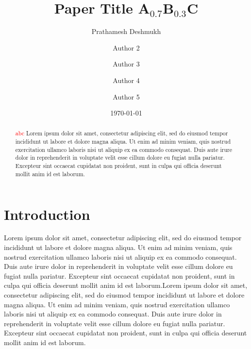 \documentclass[final,3p,times,twocolumn]{elsarticle}
\begin{document}
\begin{frontmatter} 

\title{Paper Title A$_{0.7}$B$_{0.3}$C}

\author[1]{Prathamesh Deshmukh}
\author[1]{Author 2}
\author[1]{Author 3}
\author[1]{Author 4}
\author[1]{Author 5}


\date{\today}

\begin{abstract}
\textcolor{red}{abc}
Lorem ipsum dolor sit amet, consectetur adipiscing elit, sed do eiusmod tempor incididunt ut labore et dolore magna aliqua. Ut enim ad minim veniam, quis nostrud exercitation ullamco laboris nisi ut aliquip ex ea commodo consequat. Duis aute irure dolor in reprehenderit in voluptate velit esse cillum dolore eu fugiat nulla pariatur. Excepteur sint occaecat cupidatat non proident, sunt in culpa qui officia deserunt mollit anim id est laborum.
\end{abstract}
\end{frontmatter}

 \begin{comment}

Lorem ipsum dolor sit amet, consectetur adipiscing elit, sed do eiusmod tempor incididunt ut labore et dolore magna aliqua. Ut enim ad minim veniam, quis nostrud exercitation ullamco laboris nisi ut aliquip ex ea commodo consequat. Duis aute irure dolor in reprehenderit in voluptate velit esse cillum dolore eu fugiat nulla pariatur. Excepteur sint occaecat cupidatat non proident, sunt in culpa qui officia deserunt mollit anim id est laborum.
    
\end{comment}




\section{Introduction}

Lorem ipsum dolor sit amet, consectetur adipiscing elit, sed do eiusmod tempor incididunt ut labore et dolore magna aliqua. Ut enim ad minim veniam, quis nostrud exercitation ullamco laboris nisi ut aliquip ex ea commodo consequat. Duis aute irure dolor in reprehenderit in voluptate velit esse cillum dolore eu fugiat nulla pariatur. Excepteur sint occaecat cupidatat non proident, sunt in culpa qui officia deserunt mollit anim id est laborum.Lorem ipsum dolor sit amet, consectetur adipiscing elit, sed do eiusmod tempor incididunt ut labore et dolore magna aliqua. Ut enim ad minim veniam, quis nostrud exercitation ullamco laboris nisi ut aliquip ex ea commodo consequat. Duis aute irure dolor in reprehenderit in voluptate velit esse cillum dolore eu fugiat nulla pariatur. Excepteur sint occaecat cupidatat non proident, sunt in culpa qui officia deserunt mollit anim id est laborum\cite{deshmukh_exploration_2025}.
\end{document}
